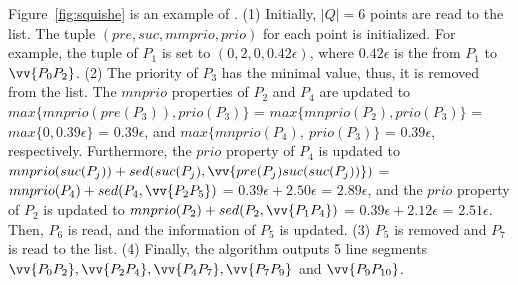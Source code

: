\begin{example}
	\label{exm-alg-squishe}
	Figure~\ref{fig:squishe} is an example of \squishe.
	(1) Initially, $|Q| = 6$ points are read to the list. The tuple $(pre, suc, mmprio, prio)$ for each point is initialized. For example, the tuple of $P_1$ is set to $(0, 2, 0, 0.42\epsilon)$, where $0.42\epsilon$ is the \sed from $P_1$ to $\vv{P_0P_2}$.
	(2) The priority of $P_3$ has the minimal value, thus, it is removed from the list.
	The $mnprio$ properties of $P_2$ and $P_4$ are updated to $max\{mnprio(pre(P_3)), prio(P_3)\}$ = $max\{mnprio(P_2), prio(P_3)\}$ = $max\{0, 0.39\epsilon\}$ = $0.39\epsilon$, and $max\{mnprio(P_4), ~prio(P_3)\}$ = $0.39\epsilon$, respectively.
	Furthermore, the $prio$ property of $P_4$ is updated to $mnprio(suc(P_j)) + sed(suc(P_j),\vv{pre(P_{j})suc(suc(P_{j}))})$ = $mnprio(P_4) + sed(P_4,\vv{P_2P_5})$ = $0.39\epsilon + 2.50\epsilon$ = $2.89\epsilon$, and the $prio$ property of $P_2$ is updated to $mnprio(P_2) + sed(P_2,\vv{P_1P_4})$ = $0.39\epsilon + 2.12\epsilon$ = $2.51\epsilon$.
	Then, $P_6$ is read, and the information of $P_5$ is updated.
	(3) $P_5$ is removed and $P_7$ is read to the list.
	(4) Finally, the algorithm outputs 5 line segments $\vv{P_0P_2},\vv{P_2P_4},\vv{P_4P_7},\vv{P_7P_9}$ and $\vv{P_9P_{10}}$.
\end{example}







